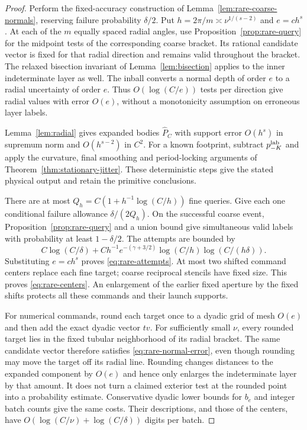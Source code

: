 \begin{proof}
Perform the fixed-accuracy construction of
Lemma~\ref{lem:rare-coarse-normals}, reserving failure probability
$\delta/2$. Put $h=2\pi/m\asymp\nu^{1/(s-2)}$ and $e=c h^s$.
At each of the $m$ equally spaced radial angles, use
Proposition~\ref{prop:rare-query} for the midpoint tests of the
corresponding coarse bracket. Its rational candidate vector is fixed
for that radial direction and remains valid throughout the bracket.
The relaxed bisection invariant of Lemma~\ref{lem:bisection} applies
to the inner indeterminate layer as well. The inball converts a normal
depth of order $e$ to a radial uncertainty of order $e$. Thus
$O(\log(C/e))$ tests per direction give radial values with error
$O(e)$, without a monotonicity assumption on erroneous layer labels.

Lemma~\ref{lem:radial} gives expanded bodies $\widehat P_C$ with
support error $O(h^s)$ in supremum norm and $O(h^{s-2})$ in $C^2$.
For a known footprint, subtract $p_{-K}^{\rm lab}$ and apply the
curvature, final smoothing and period-locking arguments of
Theorem~\ref{thm:stationary-jitter}. These deterministic steps give
the stated physical output and retain the primitive conclusions.

There are at most $Q_h=C(1+h^{-1}\log(C/h))$ fine queries. Give
each one conditional failure allowance $\delta/(2Q_h)$. On the
successful coarse event, Proposition~\ref{prop:rare-query} and a
union bound give simultaneous valid labels with probability at least
$1-\delta/2$. The attempts are bounded by
\[
 C\log(C/\delta)
   +C h^{-1}e^{-(\gamma+3/2)}
                   \log(C/h)\log(C/(h\delta)).
\]
Substituting $e=c h^s$ proves \eqref{eq:rare-attempts}. At most two
shifted command centers replace each fine target; coarse reciprocal
stencils have fixed size. This proves \eqref{eq:rare-centers}.
An enlargement of the earlier fixed aperture by the fixed shifts
protects all these commands and their launch supports.

For numerical commands, round each target once to a dyadic grid of
mesh $O(e)$ and then add the exact dyadic vector $tv$. For sufficiently
small $\nu$, every rounded target lies in the fixed tubular neighborhood
of its radial bracket. The same candidate vector therefore satisfies
\eqref{eq:rare-normal-error}, even though rounding may move the target
off its radial line. Rounding changes distances to the expanded component
by $O(e)$ and hence only enlarges the indeterminate layer by that
amount. It does not turn a claimed exterior test at the rounded point
into a probability estimate. Conservative dyadic lower bounds for
$b_e$ and integer batch counts give the same costs. Their descriptions,
and those of the centers, have
$O(\log(C/\nu)+\log(C/\delta))$ digits per batch.


\end{proof}
